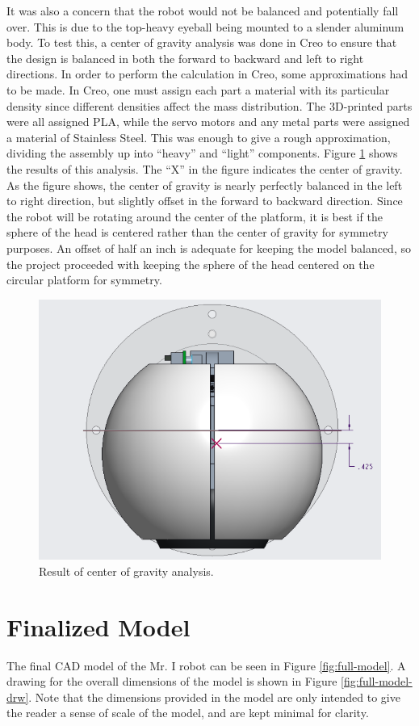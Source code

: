 It was also a concern that the robot would not be balanced and potentially fall over. This is due to the top-heavy eyeball being mounted to a slender aluminum body. To test this, a center of gravity analysis was done in Creo to ensure that the design is balanced in both the forward to backward and left to right directions. In order to perform the calculation in Creo, some approximations had to be made. In Creo, one must assign each part a material with its particular density since different densities affect the mass distribution. The 3D-printed parts were all assigned PLA, while the servo motors and any metal parts were assigned a material of Stainless Steel. This was enough to give a rough approximation, dividing the assembly up into ``heavy'' and ``light'' components. Figure \ref{fig:cog_test} shows the results of this analysis. The ``X'' in the figure indicates the center of gravity. As the figure shows, the center of gravity is nearly perfectly balanced in the left to right direction, but slightly offset in the forward to backward direction. Since the robot will be rotating around the center of the platform, it is best if the sphere of the head is centered rather than the center of gravity for symmetry purposes. An offset of half an inch is adequate for keeping the model balanced, so the project proceeded with keeping the sphere of the head centered on the circular platform for symmetry.

\begin{figure}[h]
    \centering
    \includegraphics[width=0.5\linewidth]{Thesis/ch2/analysis2.png}
    \caption{Result of center of gravity analysis.}
    \label{fig:cog_test}
\end{figure}

\section{Finalized Model}
The final CAD model of the Mr. I robot can be seen in Figure \ref{fig:full-model}. A drawing for the overall dimensions of the model is shown in Figure \ref{fig:full-model-drw}. Note that the dimensions provided in the model are only intended to give the reader a sense of scale of the model, and are kept minimal for clarity.

